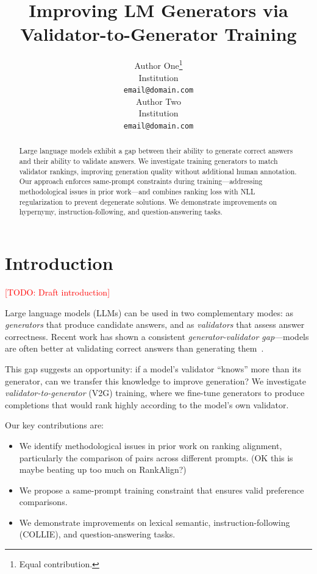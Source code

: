 \documentclass{article}
\title{Improving LM Generators via Validator-to-Generator Training}
\author{
  Author One\thanks{Equal contribution.} \\
  Institution \\
  \texttt{email@domain.com} \\
  \And
  Author Two\footnotemark[1] \\
  Institution \\
  \texttt{email@domain.com} \\
}
\newcommand{\todo}[1]{\textcolor{red}{[TODO: #1]}}
\begin{document}
\maketitle

\begin{abstract}
Large language models exhibit a gap between their ability to generate correct answers and their ability to validate answers. We investigate training generators to match validator rankings, improving generation quality without additional human annotation. Our approach enforces same-prompt constraints during training—addressing methodological issues in prior work—and combines ranking loss with NLL regularization to prevent degenerate solutions. We demonstrate improvements on hypernymy, instruction-following, and question-answering tasks.
\end{abstract}

\section{Introduction}
\label{sec:intro}

\todo{Draft introduction}

Large language models (LLMs) can be used in two complementary modes: as \emph{generators} that produce candidate answers, and as \emph{validators} that assess answer correctness. Recent work has shown a consistent \emph{generator-validator gap}---models are often better at validating correct answers than generating them~\citep{west2022symbolic}.

This gap suggests an opportunity: if a model's validator ``knows'' more than its generator, can we transfer this knowledge to improve generation? We investigate \emph{validator-to-generator} (V2G) training, where we fine-tune generators to produce completions that would rank highly according to the model's own validator.

Our key contributions are:
\begin{itemize}
    \item We identify methodological issues in prior work on ranking alignment, particularly the comparison of pairs across different prompts. (OK this is maybe beating up too much on RankAlign?)
    \item We propose a same-prompt training constraint that ensures valid preference comparisons.
    \item We demonstrate improvements on lexical semantic, instruction-following (COLLIE), and question-answering tasks.
\end{itemize}
\end{document}
